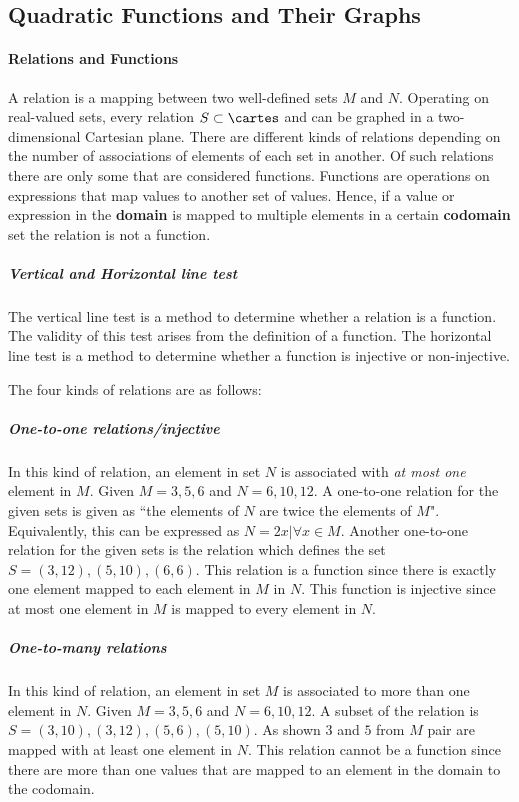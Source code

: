 \subsection{Quadratic Functions and Their Graphs}
\paragraph{Relations and Functions}
A relation is a mapping between two well-defined sets $M$ and $N$.
Operating on real-valued sets, every relation $S \subset \cartes$ and can be graphed in a two-dimensional Cartesian plane.
There are different kinds of relations depending on the number of associations of elements of each set in another.
Of such relations there are only some that are considered functions.
Functions are operations on expressions that map values to another set of values.
Hence, if a value or expression in the \textbf{domain} is mapped to multiple elements in a certain \textbf{codomain} set the relation is not a function.

\subparagraph{Vertical and Horizontal line test}
The vertical line test is a method to determine whether a relation is a function.
The validity of this test arises from the definition of a function.
The horizontal line test is a method to determine whether a function is injective or non-injective.

The four kinds of relations are as follows:

\subparagraph{One-to-one relations/injective}
In this kind of relation, an element in set $N$ is associated with \emph{at most one} element in $M$.
Given $M = {3, 5, 6}$ and $N = {6, 10, 12}$.
A one-to-one relation for the given sets is given as ``the elements of $N$ are twice the elements of $M$".
Equivalently, this can be expressed as $N = {2x | \forall x \in M}$.
Another one-to-one relation for the given sets is the relation which defines the set $S = {(3, 12), (5, 10), (6, 6)}$.
This relation is a function since there is exactly one element mapped to each element in $M$ in $N$.
This function is injective since at most one element in $M$ is mapped to every element in $N$.

\subparagraph{One-to-many relations}
In this kind of relation, an element in set $M$ is associated to more than one element in $N$.
Given $M = {3, 5, 6}$ and $N = {6, 10, 12}$.
A subset of the relation is $S = {(3, 10), (3, 12), (5, 6), (5, 10)}$.
As shown $3$ and $5$ from $M$ pair are mapped with at least one element in $N$.
This relation cannot be a function since there are more than one values that are mapped to an element in the domain to the codomain.

